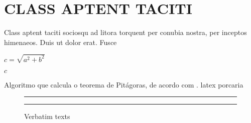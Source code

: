 \documentclass[acronym,symbols]{fei}
\begin{document}
\section{CLASS APTENT TACITI}

Class aptent taciti sociosqu ad litora torquent per conubia nostra, per  inceptos himenaeos. Duis ut dolor erat. Fusce 
\begin{algorithm}

  \(c=\sqrt{a^2 + b^2}\)

  \Retorna \(c\)

  \caption{Algoritmo que calcula o teorema de Pitágoras, de acordo com \textcite{heath1921history}. latex porcaria \cite{art1}}
  \label{lst:alg}
\end{algorithm}

\begin{figure}
  \centering
  \caption{Verbatim texts}
  \begin{minipage}    {0.3\textwidth}
    \rule{2cm}{2cm}
  \end{minipage}
  \hfill
  \begin{minipage}
    {0.3\textwidth}
    \rule{2cm}{2cm}
  \end{minipage}
\end{figure}

\printbibliography

%
%

\printindex
\end{document}

